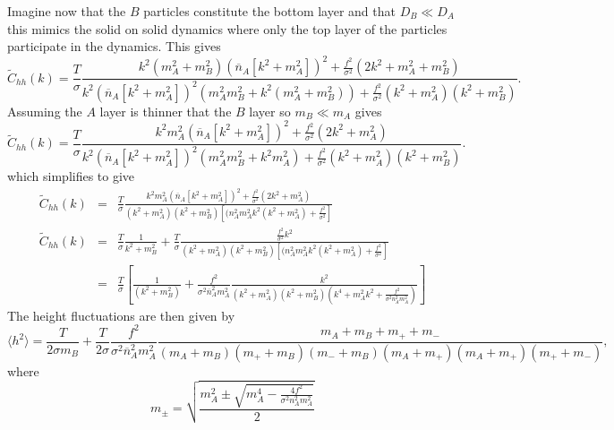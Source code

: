 Imagine now that the $B$ particles constitute the bottom layer and that $D_B\ll D_A$ this mimics the solid on solid dynamics where only the top layer of the particles participate in the dynamics. This gives
\begin{equation}
\tilde C_{hh}(k)= \frac{T}{\sigma}\frac{k^2(m_A^2+m_B^2)(\overline n_A[k^2+m_A^2] )^2 +\frac{f^2 }{\sigma^2}(2k^2+m_A^2 + m_B^2)}{k^2(\overline n_A[k^2+m_A^2]  )^2(m_A^2 m_B^2 + k^2(m_A^2 +m_B^2))
+\frac{f^2 }{\sigma^2}(k^2+m_A^2)(k^2+m_B^2)}.
\end{equation}
Assuming the $A$ layer is thinner that the $B$ layer so $m_B\ll m_A$ gives
\begin{equation}
\tilde C_{hh}(k)= \frac{T}{\sigma}\frac{k^2 m_A^2(\overline n_A[k^2+m_A^2] )^2 +\frac{f^2 }{\sigma^2}(2k^2+m_A^2 )}{k^2(\overline n_A[k^2+m_A^2]  )^2(m_A^2 m_B^2 + k^2 m_A^2)
+\frac{f^2 }{\sigma^2}(k^2+m_A^2)(k^2+m_B^2)}.
\end{equation}
which simplifies to give
\begin{eqnarray}
\tilde C_{hh}(k)&=& \frac{T}{\sigma}\frac{k^2 m_A^2(\overline n_A[k^2+m_A^2] )^2 +\frac{f^2 }{\sigma^2}(2k^2+m_A^2 )}{(k^2+m_A^2)(k^2 + m_B^2)[(n_A^2m_A^2 k^2(k^2+m_A^2)
+\frac{f^2 }{\sigma^2}]} \\
\tilde C_{hh}(k)&=& \frac{T}{\sigma}\frac{1}{k^2 + m_B^2}
+\frac{T}{\sigma}\frac{\frac{f^2 }{\sigma^2}k^2}{(k^2+m_A^2)(k^2 + m_B^2)[(n_A^2m_A^2 k^2(k^2+m_A^2)
+\frac{f^2 }{\sigma^2}]} 
\\
&=&\frac{T}{\sigma}\left[\frac{1}{(k^2 + m_B^2)}
+\frac{ f^2 }{\sigma^2\overline n_A^2 m_A^2}\frac{k^2}{(k^2+m_A^2)(k^2 + m_B^2)(k^4+m_A^2 k^2 +\frac{f^2 }{\sigma^2n_A^2 m_A^2})}\right]
\end{eqnarray}
The height fluctuations are then given by
\begin{equation}
\langle h^2\rangle = \frac{T}{2\sigma m_B} +  \frac{T}{2\sigma}\frac{ f^2 }{\sigma^2\overline n_A^2 m_A^2}\frac{m_A + m_B+ m_++ m_-}{(m_A+m_B) (m_++m_B)(m_-+m_B)(m_A+m_+)(m_A+m_+)(m_++m_-)},
\end{equation}
where 
\begin{equation}
m_\pm = \sqrt{\frac{m_A^2\pm\sqrt{m_A^4 -\frac{4f^2 }{\sigma^2n_A^2 m_A^2}}}{2}}
\end{equation}

